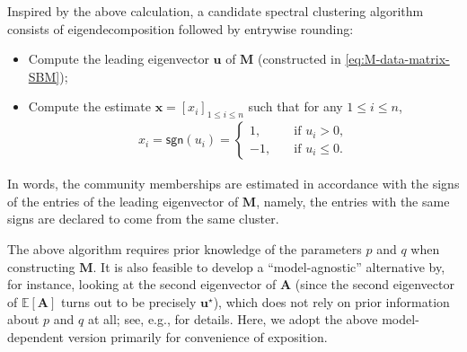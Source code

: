 Inspired by the above calculation, a candidate spectral clustering algorithm consists of eigendecomposition followed by entrywise rounding:
%
\begin{itemize}
	\item[1.] Compute the leading eigenvector $\bm{u}$ of  $\bm{M}$ (constructed in \eqref{eq:M-data-matrix-SBM});
	\item[2.] Compute the estimate $\bm{x}=[x_i]_{1\leq i\leq n}$  such that for any $1\leq i\leq n$,
	\begin{align}
		  x_{i}= \mathsf{sgn}(u_i)  =
		  \begin{cases}
1,\quad & \text{if }u_{i}>0,\\
-1, \quad & \text{if }u_i \leq 0.
\end{cases}
	\end{align}
\end{itemize}
%
In words, the community memberships are estimated in accordance with the signs of the entries of the leading eigenvector of $\bm{M}$, namely, the entries with the same signs are declared to come from the same cluster.


\begin{remark}
	The above algorithm requires prior knowledge of the parameters $p$ and $q$ when constructing  $\bm{M}$. It is also feasible to develop a ``model-agnostic'' alternative by, for instance, looking at the second eigenvector of $\bm{A}$ (since the second eigenvector of $\mathbb{E}[\bm{A}]$ turns out to be precisely $\bm{u}^{\star}$), which does not rely on prior information about $p$ and $q$ at all; see, e.g., \citet{abbe2020entrywise} for details.  Here, we adopt the above model-dependent version primarily for convenience of exposition.  %
\end{remark}


